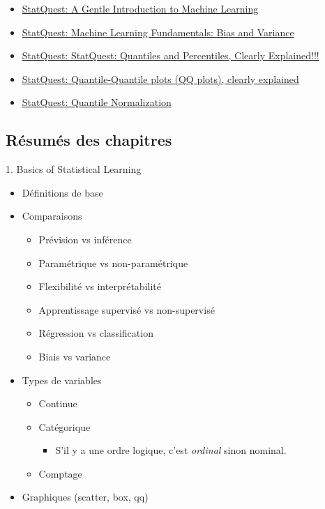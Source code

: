 \documentclass[12pt, titlepage, french]{report}
\begin{document}
\begin{YTB_vids}
\begin{itemize}
	\item	\href{https://www.youtube.com/watch?v=Gv9_4yMHFhI&list=PLblh5JKOoLUICTaGLRoHQDuF_7q2GfuJF&index=2&t=0s}{StatQuest: A Gentle Introduction to Machine Learning}
	\item	\href{https://www.youtube.com/watch?v=EuBBz3bI-aA&list=PLblh5JKOoLUICTaGLRoHQDuF_7q2GfuJF&index=6}{StatQuest: Machine Learning Fundamentals: Bias and Variance}
	\item	\href{https://www.youtube.com/watch?v=IFKQLDmRK0Y&feature=youtu.be}{StatQuest: StatQuest: Quantiles and Percentiles, Clearly Explained!!!}
	\item	\href{https://www.youtube.com/watch?v=okjYjClSjOg&list=PLblh5JKOoLUIcdlgu78MnlATeyx4cEVeR&index=20}{StatQuest: Quantile-Quantile plots (QQ plots), clearly explained}
	\item	\href{https://www.youtube.com/watch?v=ecjN6Xpv6SE&feature=youtu.be}{StatQuest: Quantile Normalization}
\end{itemize}
\end{YTB_vids}

\subsection{Résumés des chapitres}

\begin{CHPT_SUMM}{1. Basics of Statistical Learning}
	\begin{itemize}
		\item	Définitions de base
		\item	Comparaisons
		\begin{itemize}
			\item	Prévision vs inférence
			\item	Paramétrique vs non-paramétrique 
			\item	Flexibilité vs interprétabilité
			\item	Apprentissage supervisé vs non-supervisé
			\item	Régression vs classification
			\item	Biais vs variance 
		\end{itemize}
		\item	Types de variables
		\begin{itemize}
			\item	Continue
			\item	Catégorique
			\begin{itemize}
				\item[]	S'il y a une ordre logique, c'est \textit{ordinal} sinon nominal.
			\end{itemize}
			\item	Comptage
		\end{itemize}
		\item	Graphiques (scatter, box, qq)
	\end{itemize}
\end{CHPT_SUMM}
\end{document}
